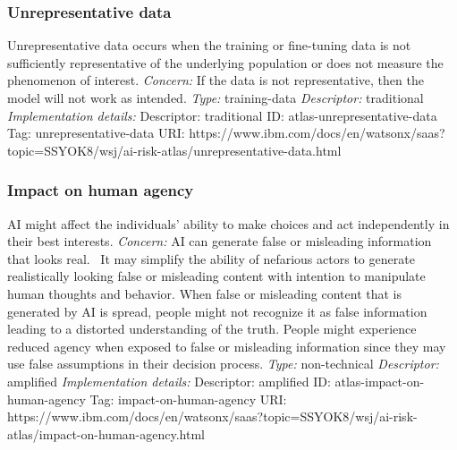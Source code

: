\documentclass{article}
\begin{document}
\subsubsection*{Unrepresentative data}
Unrepresentative data occurs when the training or fine-tuning data is not sufficiently representative of the underlying population or does not measure the phenomenon of interest.\newline
\textit{Concern: }If the data is not representative, then the model will not work as intended.\newline\newline
\textit{Type: }training-data\newline
\textit{Descriptor: }traditional \newline\newline
\textit{Implementation details:} \newline
Descriptor: traditional \newline
ID: atlas-unrepresentative-data \newline
Tag: unrepresentative-data \newline
URI:  https://www.ibm.com/docs/en/watsonx/saas?topic=SSYOK8/wsj/ai-risk-atlas/unrepresentative-data.html\newline
\subsubsection*{Impact on human agency}
AI might affect the individuals' ability to make choices and act independently in their best interests.\newline
\textit{Concern: }AI can generate false or misleading information that looks real.  It may simplify the ability of nefarious actors to generate realistically looking false or misleading content with intention to manipulate human thoughts and behavior. When false or misleading content that is generated by AI is spread, people might not recognize it as false information leading to a distorted understanding of the truth. People might experience reduced agency when exposed to false or misleading information since they may use false assumptions in their decision process.\newline\newline
\textit{Type: }non-technical\newline
\textit{Descriptor: }amplified \newline\newline
\textit{Implementation details:} \newline
Descriptor: amplified \newline
ID: atlas-impact-on-human-agency \newline
Tag: impact-on-human-agency \newline
URI:  https://www.ibm.com/docs/en/watsonx/saas?topic=SSYOK8/wsj/ai-risk-atlas/impact-on-human-agency.html\newline
\end{document}
